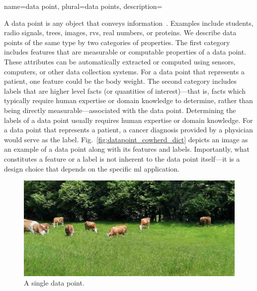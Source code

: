 {name={data point}, plural={data points},
	description={A \gls{data} point is any object that conveys information~\cite{coverthomas}. 
		Examples include students, radio signals, trees, images, \glspl{rv}, real numbers, 
 		or proteins. We describe \gls{data} points of the same type by two categories 
		of properties. The first category includes \glspl{feature} that are \gls{measurable} or 
		computable properties of a \gls{data} point. These attributes can be automatically extracted 
		or computed using sensors, computers, or other \gls{data} collection systems. For a \gls{data} 
		point that represents a patient, one \gls{feature} could be the body weight.
		The second category includes \glspl{label} that are higher level facts (or quantities of interest)—that is, facts which typically require human expertise or domain knowledge to determine, rather than being directly measurable—associated with the \gls{data} point. Determining the \glspl{label} of a \gls{data} point 
		usually requires human expertise or domain knowledge. For a \gls{data} point that represents a patient, 
		a cancer diagnosis provided by a physician would serve as the \gls{label}. 
		Fig.\ \ref{fig:datapoint_cowherd_dict} depicts an image as an example of a \gls{data} 
		point along with its \glspl{feature} and \glspl{label}. Importantly, what constitutes 
		a \gls{feature} or a \gls{label} is not inherent to the \gls{data} point itself—it is a design 
		choice that depends on the specific \gls{ml} application.
		\begin{figure}[H]
    		\centering
    			\begin{minipage}[t]{0.95\textwidth}
        			\centering
        			\includegraphics[width=\textwidth]{assets/CowsAustria.jpg}
        			\caption*{A single \gls{data} point.}
        			\vspace{5mm}
    			\end{minipage}

\end{figure}}}
